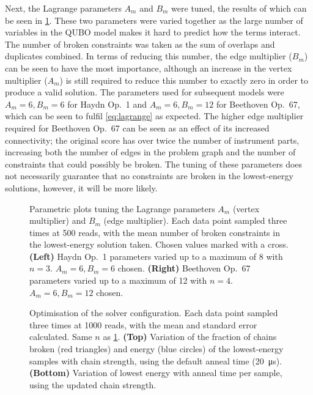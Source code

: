 \documentclass[twocolumn]{article}
\theoremstyle{definition}
\begin{document}
Next, the Lagrange parameters $A_m$ and $B_m$ were tuned, the results of which can be seen in \cref{fig:lagrange}. These two parameters were varied together as the large number of variables in the QUBO model makes it hard to predict how the terms interact.
The number of broken constraints was taken as the sum of overlaps and duplicates combined. In terms of reducing this number, the edge multiplier ($B_m$) can be seen to have the most importance, although an increase in the vertex multiplier ($A_m$) is still required to reduce this number to exactly zero in order to produce a valid solution. The parameters used for subsequent models were $A_m=6,B_m=6$ for Haydn Op.\ 1 and $A_m=6,B_m=12$ for Beethoven Op.\ 67, which can be seen to fulfil \cref{eq:lagrange} as expected. The higher edge multiplier required for Beethoven Op.\ 67 can be seen as an effect of its increased connectivity; the original score has over twice the number of instrument parts, increasing both the number of edges in the problem graph and the number of constraints that could possibly be broken. The tuning of these parameters does not necessarily guarantee that no constraints are broken in the lowest-energy solutions, however, it will be more likely.

\begin{figure}[p]
    \centering\footnotesize
    
    \caption{Parametric plots tuning the Lagrange parameters $A_m$ (vertex multiplier) and $B_m$ (edge multiplier). Each data point sampled three times at \num{500} reads, with the mean number of broken constraints in the lowest-energy solution taken. Chosen values marked with a cross. \textbf{(Left)} Haydn Op.\ 1 parameters varied up to a maximum of \num{8} with $n=3$. $A_m=6,B_m=6$ chosen. \textbf{(Right)} Beethoven Op.\ 67 parameters varied up to a maximum of \num{12} with $n=4$. $A_m=6,B_m=12$ chosen.}
    \label{fig:lagrange}
\end{figure}

\begin{figure}[p]
    \centering\footnotesize
    
    \caption{Optimisation of the solver configuration. Each data point sampled three times at \num{1000} reads, with the mean and standard error calculated. Same $n$ as \cref{fig:lagrange}. \textbf{(Top)} Variation of the fraction of chains broken (red triangles) and energy (blue circles) of the lowest-energy samples with chain strength, using the default anneal time (\qty{20}{\us}).  \textbf{(Bottom)} Variation of lowest energy with anneal time per sample, using the updated chain strength.}
    \label{fig:solver-configuration}
\end{figure}
\end{document}

